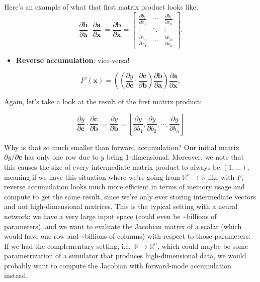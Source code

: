 \documentclass[
  11pt,
  numbers=noendperiod]{book}
\providecommand{\tightlist}{%
  \setlength{\itemsep}{0pt}\setlength{\parskip}{0pt}}\usepackage{longtable,booktabs,array}
\begin{document}
Here's an example of what that first matrix product looks like: \[
\frac{\partial \mathbf{b}}{\partial \mathbf{a}} \cdot \frac{\partial \mathbf{a}}{\partial \mathbf{x}}\ =\frac{\partial \mathbf{b}}{\partial \mathbf{x}}=\left[\begin{array}{ccc}\frac{\partial b_{1}}{\partial x_{1}} & \cdots & \frac{\partial b_{1}}{\partial x_{n}} \\\vdots & \ddots & \vdots \\\frac{\partial b_{m}}{\partial x_{1}} & \cdots & \frac{\partial b_{m}}{\partial x_{n}}\end{array}\right].
\]

\begin{itemize}
\tightlist
\item
  \textbf{Reverse accumulation}: vice-versa!
\end{itemize}

\[
F'(\mathbf{x}) = \left( \left( \frac{\partial y}{\partial \mathbf{c}} \cdot \frac{\partial \mathbf{c}}{\partial \mathbf{b}} \right)\frac{\partial \mathbf{b}}{\partial \mathbf{a}} \right)\frac{\partial \mathbf{a}}{\partial \mathbf{x}},
\]

Again, let's take a look at the result of the first matrix product:

\[
\frac{\partial y}{\partial \mathbf{c}} \cdot \frac{\partial \mathbf{c}}{\partial \mathbf{b}}\ =\frac{\partial y}{\partial \mathbf{b}}= \left[ \frac{\partial y}{\partial b_1} , \frac{\partial y}{\partial b_2}, \cdots, \frac{\partial y}{\partial b_n}\right]
\]

Why is that so much smaller than forward accumulation? Our initial
matrix \(\partial y / \partial \mathbf{c}\) has only one row due to
\(y\) being 1-dimensional. Moreover, we note that this causes the size
of every intermediate matrix product to always be \((1, \dots)\),
meaning if we have this situation where we're going from
\(\mathbb{R}^n \rightarrow \mathbb{R}\) like with \(F\), reverse
accumulation looks much more efficient in terms of memory usage and
compute to get the same result, since we're only ever storing
intermediate vectors and not high-dimensional matrices. This is the
typical setting with a neural network: we have a very large input space
(could even be \textasciitilde billions of parameters), and we want to
evaluate the Jacobian matrix of a scalar (which would have one row and
\textasciitilde billions of columns) with respect to those parameters.
If we had the complementary setting,
i.e.~\(\mathbb{R} \rightarrow \mathbb{R}^n\), which could maybe be some
parametrization of a simulator that produces high-dimensional data, we
would probably want to compute the Jacobian with forward-mode
accumulation instead.
\end{document}
